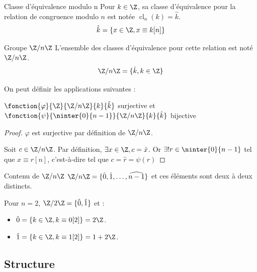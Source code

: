 \begin{definition}{Classe d'équivalence modulo n}{}
    Pour $k \in \Z$, sa classe d'équivalence pour la relation de congruence modulo $n$ 
    est notée $\operatorname{cl}_n(k) = \hat k$. 
    \[\hat k = \{x \in \Z, x \equiv k [n]\}\]
\end{definition}

\begin{definition}{Groupe $\Z/n\Z$}{}
    L'ensemble des classes d'équivalence pour cette relation est noté $\Z/n\Z$.
    \[\Z/n\Z = \{\hat k, k \in \Z\}\]
\end{definition}

\begin{theoreme}{}{}
    On peut définir les applications suivantes : 
    \begin{center}
        $\fonction{\varphi}{\Z}{\Z/n\Z}{k}{\hat k}$ surjective et
        $\fonction{\psi}{\ninter{0}{n-1}}{\Z/n\Z}{k}{\hat k}$ bijective
    \end{center}
\end{theoreme}


\begin{proof}
    $\varphi$ est surjective par définition de $\Z/n\Z$.

    Soit $c \in \Z/n\Z$. Par définition, $\exists x \in \Z, c = \hat x$. Or $\exists ! r \in \ninter{0}{n-1}$ 
    tel que $x \equiv r [n]$, c'est-à-dire tel que $c = \hat r = \psi(r)$
\end{proof}

\begin{corollaire}{Contenu de $\Z/n\Z$}{}
    $\Z/n\Z = \{\hat 0, \hat 1, \ldots, \widehat{n-1}\}$ et ces éléments sont 
    deux à deux distincts.
\end{corollaire}

\begin{exemple}
    Pour $n = 2$, $\Z/2\Z = \{\hat 0, \hat 1\}$ et :
    \begin{itemize}
        \item $\hat 0 = \{k \in \Z, k \equiv 0 [2]\} = 2 \Z$.
        \item $\hat 1 = \{k \in \Z, k \equiv 1 [2]\} = 1 + 2 \Z$.
    \end{itemize}
\end{exemple}

\subsection{Structure}

